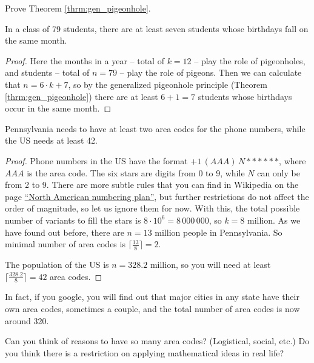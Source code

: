\begin{exercise}
Prove Theorem \ref{thrm:gen_pigeonhole}.
\end{exercise}

\begin{example}
In a class of 79 students, there are at least seven students whose birthdays fall on the same month.
\end{example}

\begin{proof}
Here the months in a year -- total of $k=12$ -- play the role of pigeonholes, and students -- total of $n=79$ -- play the role of pigeons. Then we can calculate that $n = 6 \cdot k + 7$, so by the generalized pigeonhole principle (Theorem \ref{thrm:gen_pigeonhole}) there are at least $6+1 = 7$ students whose birthdays occur in the same month.
\end{proof}

\begin{example}
Pennsylvania needs to have at least two area codes for the phone numbers, while the US needs at least 42.
\end{example}

\begin{proof}
Phone numbers in the US have the format $+1 \, (AAA) \, N******$, where $AAA$ is the area code. The six stars are digits from 0 to 9, while $N$ can only be from 2 to 9. There are more subtle rules that you can find in Wikipedia on the page \href{https://en.wikipedia.org/wiki/North_American_Numbering_Plan#Modern_plan}{``North American numbering plan''}, but further restrictions do not affect the order of magnitude, so let us ignore them for now.
With this, the total possible number of variants to fill the stars is $8 \cdot 10^6 = 8\,000\,000$, so $k=8$ million. As we have found out before, there are $n = 13$ million people in Pennsylvania. So minimal number of area codes is $\lceil \frac{13}{8} \rceil = 2$.

The population of the US is $n=328.2$ million, so you will need at least $\lceil \frac{328.2}{8} \rceil = 42$ area codes.
\end{proof}

In fact, if you google, you will find out that major cities in any state have their own area codes, sometimes a couple, and the total number of area codes is now around 320. 

\begin{exercise}
Can you think of reasons to have so many area codes? (Logistical, social, etc.) Do you think there is a restriction on applying mathematical ideas in real life?
\end{exercise}



